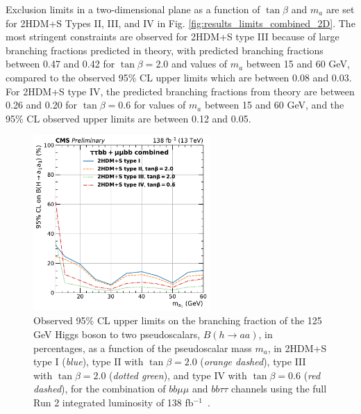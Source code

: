 Exclusion limits in a two-dimensional plane as a function of $\tan\beta$ and $m_{a}$ are set for 2HDM+S Types II, III, and IV in Fig. \ref{fig:results_limits_combined_2D}. The most stringent constraints are observed for 2HDM+S type III because of large branching fractions predicted in theory, with predicted branching fractions between 0.47 and 0.42 for $\tan\beta = 2.0$ and values of $m_{a}$ between 15 and 60 GeV, compared to the observed 95\% CL upper limits which are between 0.08 and 0.03. For 2HDM+S type IV, the predicted branching fractions from theory are between 0.26 and 0.20 for $\tan\beta = 0.6$ for values of $m_{a}$ between 15 and 60 GeV, and the 95\% CL observed upper limits are between 0.12 and 0.05.  

  \begin{figure}[h!]
    \begin{center}
      \includegraphics[width=0.6\textwidth]{figures/ch-10-results/HAA_comb_all_prelim.pdf}
    \end{center}
    \caption[Observed 95\% CL upper limits on the branching fraction of the 125 GeV Higgs boson to two pseudoscalars, $B(h\to aa)$, in percentages, as a function of the pseudoscalar mass $m_a$, in 2HDM+S type I (\textit{blue}), type II with $\tan\beta = 2.0$ (\textit{orange dashed}), type III with $\tan\beta = 2.0$ (\textit{dotted green}), and type IV with $\tan\beta = 0.6$ (\textit{red dashed}), for the combination of $bb\mu\mu$ and $bb\tau\tau$ channels using the full Run 2 integrated luminosity of 138 fb$^{-1}$.]{Observed 95\% CL upper limits on the branching fraction of the 125 GeV Higgs boson to two pseudoscalars, $B(h\to aa)$, in percentages, as a function of the pseudoscalar mass $m_a$, in 2HDM+S type I (\textit{blue}), type II with $\tan\beta = 2.0$ (\textit{orange dashed}), type III with $\tan\beta = 2.0$ (\textit{dotted green}), and type IV with $\tan\beta = 0.6$ (\textit{red dashed}), for the combination of $bb\mu\mu$ and $bb\tau\tau$ channels using the full Run 2 integrated luminosity of 138 fb$^{-1}$~\cite{CMS-AN-20-213}.}
      \label{fig:results_limits_combined}
  \end{figure}
  


